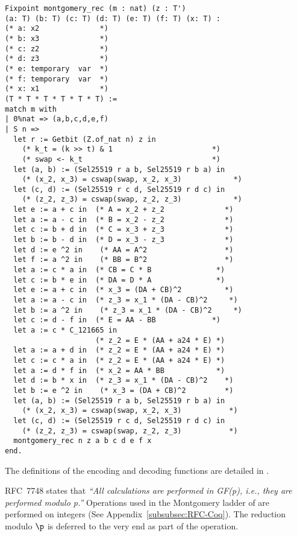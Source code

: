 \begin{lstlisting}[language=Coq]
Fixpoint montgomery_rec (m : nat) (z : T')
(a: T) (b: T) (c: T) (d: T) (e: T) (f: T) (x: T) :
(* a: x2              *)
(* b: x3              *)
(* c: z2              *)
(* d: z3              *)
(* e: temporary  var  *)
(* f: temporary  var  *)
(* x: x1              *)
(T * T * T * T * T * T) :=
match m with
| 0%nat => (a,b,c,d,e,f)
| S n =>
  let r := Getbit (Z.of_nat n) z in
    (* k_t = (k >> t) & 1                       *)
    (* swap <- k_t                              *)
  let (a, b) := (Sel25519 r a b, Sel25519 r b a) in
    (* (x_2, x_3) = cswap(swap, x_2, x_3)            *)
  let (c, d) := (Sel25519 r c d, Sel25519 r d c) in
    (* (z_2, z_3) = cswap(swap, z_2, z_3)            *)
  let e := a + c in  (* A = x_2 + z_2              *)
  let a := a - c in  (* B = x_2 - z_2              *)
  let c := b + d in  (* C = x_3 + z_3              *)
  let b := b - d in  (* D = x_3 - z_3              *)
  let d := e ^2 in    (* AA = A^2                  *)
  let f := a ^2 in    (* BB = B^2                  *)
  let a := c * a in  (* CB = C * B               *)
  let c := b * e in  (* DA = D * A               *)
  let e := a + c in  (* x_3 = (DA + CB)^2          *)
  let a := a - c in  (* z_3 = x_1 * (DA - CB)^2     *)
  let b := a ^2 in    (* z_3 = x_1 * (DA - CB)^2     *)
  let c := d - f in  (* E = AA - BB             *)
  let a := c * C_121665 in
                     (* z_2 = E * (AA + a24 * E) *)
  let a := a + d in  (* z_2 = E * (AA + a24 * E) *)
  let c := c * a in  (* z_2 = E * (AA + a24 * E) *)
  let a := d * f in  (* x_2 = AA * BB            *)
  let d := b * x in  (* z_3 = x_1 * (DA - CB)^2    *)
  let b := e ^2 in    (* x_3 = (DA + CB)^2         *)
  let (a, b) := (Sel25519 r a b, Sel25519 r b a) in
    (* (x_2, x_3) = cswap(swap, x_2, x_3)           *)
  let (c, d) := (Sel25519 r c d, Sel25519 r d c) in
    (* (z_2, z_3) = cswap(swap, z_2, z_3)           *)
  montgomery_rec n z a b c d e f x
end.
\end{lstlisting}

The definitions of the encoding and decoding functions are detailed in
.

RFC~7748 states that \emph{``All calculations are performed in GF(p), i.e., they are performed modulo p.''}
Operations used in the Montgomery ladder of  are performed on
integers (See Appendix~\ref{subsubsec:RFC-Coq}).
The reduction modulo $\p$ is deferred to the very end as part of the  operation.

